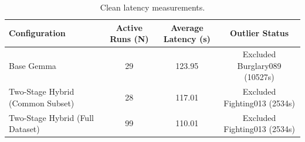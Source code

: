 \begin{table}[htbp]
  \centering
  \caption{Clean latency measurements.}
  \label{tab:pipeline_profiling}
  \begin{tabular}{lccc}
    \toprule
    Configuration & Active Runs (N) & Average Latency (s) & Outlier Status \\
    \midrule
    Base Gemma & 29 & 123.95 & Excluded Burglary089 (10527s) \\
    Two-Stage Hybrid (Common Subset) & 28 & 117.01 & Excluded Fighting013 (2534s) \\
    Two-Stage Hybrid (Full Dataset) & 99 & 110.01 & Excluded Fighting013 (2534s) \\
    \bottomrule
  \end{tabular}
\end{table}